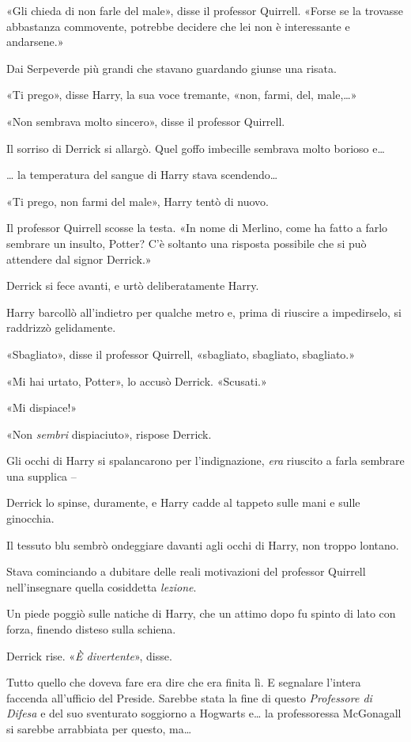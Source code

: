 «Gli chieda di non farle del male», disse il professor Quirrell. «Forse se la trovasse abbastanza commovente, potrebbe decidere che lei non è interessante e andarsene.»

Dai Serpeverde più grandi che stavano guardando giunse una risata.

«Ti prego», disse Harry, la sua voce tremante, «non, farmi, del, male,…»

«Non sembrava molto sincero», disse il professor Quirrell.

Il sorriso di Derrick si allargò. Quel goffo imbecille sembrava molto borioso e…

… la temperatura del sangue di Harry stava scendendo…

«Ti prego, non farmi del male», Harry tentò di nuovo.

Il professor Quirrell scosse la testa. «In nome di Merlino, come ha fatto a farlo sembrare un insulto, Potter? C’è soltanto una risposta possibile che si può attendere dal signor Derrick.»

Derrick si fece avanti, e urtò deliberatamente Harry.

Harry barcollò all’indietro per qualche metro e, prima di riuscire a impedirselo, si raddrizzò gelidamente.

«Sbagliato», disse il professor Quirrell, «sbagliato, sbagliato, sbagliato.»

«Mi hai urtato, Potter», lo accusò Derrick. «Scusati.»

«Mi dispiace!»

«Non \textit{sembri} dispiaciuto», rispose Derrick.

Gli occhi di Harry si spalancarono per l’indignazione, \textit{era} riuscito a farla sembrare una supplica –

Derrick lo spinse, duramente, e Harry cadde al tappeto sulle mani e sulle ginocchia.

Il tessuto blu sembrò ondeggiare davanti agli occhi di Harry, non troppo lontano.

Stava cominciando a dubitare delle reali motivazioni del professor Quirrell nell’insegnare quella cosiddetta \textit{lezione}.

Un piede poggiò sulle natiche di Harry, che un attimo dopo fu spinto di lato con forza, finendo disteso sulla schiena.

Derrick rise. «\textit{È divertente}», disse.

Tutto quello che doveva fare era dire che era finita lì. E segnalare l’intera faccenda all’ufficio del Preside. Sarebbe stata la fine di questo \textit{Professore di Difesa} e del suo sventurato soggiorno a Hogwarts e… la professoressa McGonagall si sarebbe arrabbiata per questo, ma…

